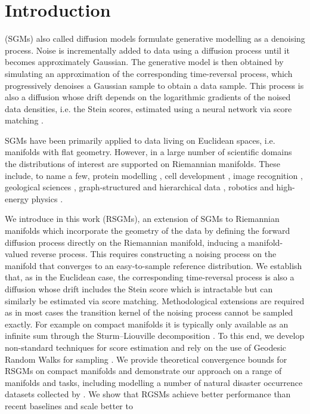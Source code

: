 
\section{Introduction}
\label{sec:introduction-rsgm}
 (SGMs) also called diffusion models \parencite{song2019generative,song2020score,ho2020denoising,nichol2021beatgans} formulate generative modelling as a denoising process.
Noise is incrementally added to data using a diffusion process until it becomes approximately Gaussian.
The generative model is then obtained by simulating an approximation of the corresponding time-reversal process, which progressively denoises a Gaussian sample to obtain a data sample.
This process is also a diffusion whose drift depends on the logarithmic gradients of the noised data densities, i.e. the Stein scores, estimated using a neural network via score matching \parencite{hyvarinen2005estimation,vincent2011connection}.

SGMs have been primarily applied to data living on Euclidean spaces, i.e. manifolds with flat geometry.
However, in a large number of scientific domains the distributions of interest are supported on Riemannian manifolds.
These include, to name a few, protein modelling \parencite{shapovalov2011smoothed}, cell development \parencite{klimovskaia2020poincare}, image recognition \parencite{lui2012advances}, geological sciences \parencite{karpatne2018machine,peel2001fitting}, graph-structured and hierarchical data \parencite{roy2007learning,steyvers2005large}, robotics \parencite{feiten2013rigid,senanayake2018directional} and high-energy physics \parencite{brehmer2020flows}.

We introduce in this work  (RSGMs), an extension of SGMs to Riemannian manifolds which incorporate the geometry of the data by defining the forward diffusion process directly on the Riemannian manifold, inducing a manifold-valued reverse process.
This requires constructing a noising process on the manifold that converges to an easy-to-sample reference distribution.
We establish that, as in the Euclidean case, the corresponding time-reversal process is also a diffusion whose drift includes the Stein score which is intractable but can similarly be estimated via score matching.
Methodological extensions are required as in most cases the transition kernel of the noising process cannot be sampled exactly.
For example on compact manifolds it is typically only available as an infinite sum through the Sturm--Liouville decomposition \parencite{chavel1984eigenvalues}.
To this end, we develop non-standard techniques for score estimation and rely on the use of Geodesic Random Walks for sampling \parencite{jorgensen1975central}.
We provide theoretical convergence bounds for RSGMs on compact manifolds and demonstrate our approach on a range of manifolds and tasks, including modelling a number of natural disaster occurrence datasets collected by \textcite{mathieu2020riemannian}.
We show that RGSMs achieve better performance than recent baselines \parencite{mathieu2020riemannian,rozen2021moser} and scale better to 

